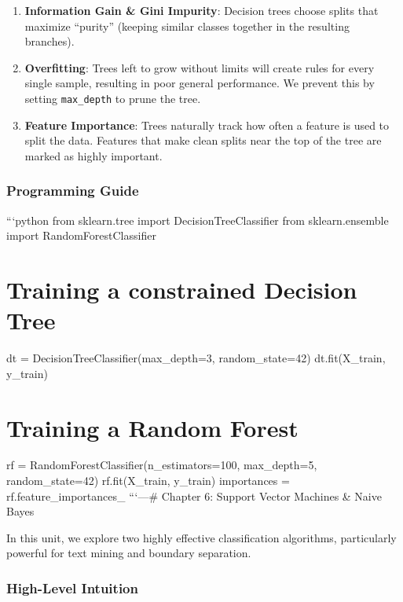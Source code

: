 \begin{enumerate}
\def\labelenumi{\arabic{enumi}.}
\tightlist
\item
  \textbf{Information Gain \& Gini Impurity}: Decision trees choose
  splits that maximize ``purity'' (keeping similar classes together in
  the resulting branches).
\item
  \textbf{Overfitting}: Trees left to grow without limits will create
  rules for every single sample, resulting in poor general performance.
  We prevent this by setting \texttt{max\_depth} to prune the tree.
\item
  \textbf{Feature Importance}: Trees naturally track how often a feature
  is used to split the data. Features that make clean splits near the
  top of the tree are marked as highly important.
\end{enumerate}

\subsubsection{Programming Guide}\label{programming-guide-4}

```python from sklearn.tree import DecisionTreeClassifier from
sklearn.ensemble import RandomForestClassifier

\section{Training a constrained Decision
Tree}\label{training-a-constrained-decision-tree}

dt = DecisionTreeClassifier(max\_depth=3, random\_state=42)
dt.fit(X\_train, y\_train)

\section{Training a Random Forest}\label{training-a-random-forest}

rf = RandomForestClassifier(n\_estimators=100, max\_depth=5,
random\_state=42) rf.fit(X\_train, y\_train) importances =
rf.feature\_importances\_ ```\n\n---\n\n\# Chapter 6: Support Vector
Machines \& Naive Bayes

In this unit, we explore two highly effective classification algorithms,
particularly powerful for text mining and boundary separation.

\subsubsection{High-Level Intuition}\label{high-level-intuition-5}

